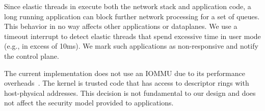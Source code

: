 Since elastic threads in \ix execute both the network stack and
application code, a long running application can block further network
processing for a set of queues. This behavior in no way affects other
applications or dataplanes. We use a timeout interrupt to detect
elastic threads that spend excessive time in user mode (e.g., in
excess of 10ms). We mark such applications as non-responsive and
notify the control plane.

The \ix current implementation does not use an IOMMU due to its
performance overheads~\cite{iommu:overhead}. The \ix kernel is trusted
code that has access to descriptor rings with host-physical addresses.
This decision is not fundamental to our design and does not affect the
security model provided to applications.


 

